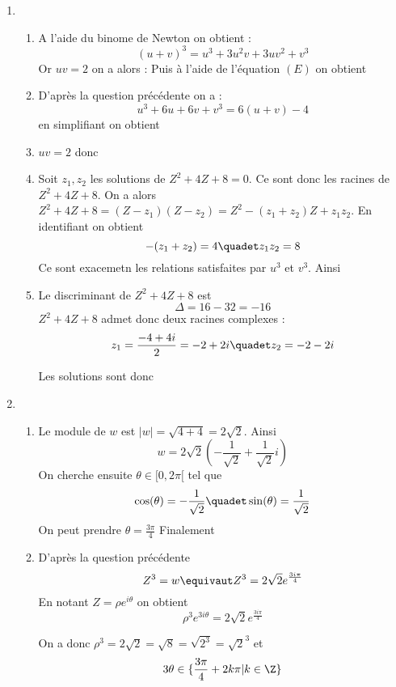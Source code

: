 \documentclass[a4paper, 11pt,reqno]{article}
\begin{document}
\begin{correction}
\begin{enumerate}
\item 
\begin{enumerate}
\item A l'aide du binome de Newton on obtient : 
$$(u+v)^3= u^3 +3u^2v+3uv^2 +v^3$$
Or $uv=2$ on a alors : 
Puis à l'aide de l'équation $(E)$ on obtient 

\item D'après la question précédente  on a : 
$$ u^3 +6u+6v +v^3 = 6(u+v) -4$$
en simplifiant on obtient 

\item 
$uv=2$ donc 

\item Soit $z_1, z_2$ les solutions  de $Z^2+4Z+8=0$. Ce sont donc les racines de $Z^2+4Z+8$. On  a alors 
$Z^2+4Z+8 =(Z-z_1)(Z-z_2)= Z^2 -(z_1+z_2)Z +z_1z_2$. En identifiant on obtient 
$$-(z_1+z_2) = 4 \quadet z_1z_2=8$$
Ce sont exacemetn les relations satisfaites par $u^3$ et $v^3$. Ainsi 

\item Le discriminant de $Z^2+4Z+8$ est 
$$\Delta = 16-32 =-16$$
$Z^2+4Z+8$ admet donc deux racines complexes :
$$z_1 = \frac{-4+4i}{2}= -2+2i \quadet z_2 = -2-2i$$

Les solutions sont donc 
\end{enumerate}
\item 
\begin{enumerate}
\item Le module de $w$ est $|w| = \sqrt{4+4} = 2\sqrt{2}$. Ainsi 
$$w=2\sqrt{2}(-\frac{1}{\sqrt{2}} +\frac{1}{\sqrt{2}} i) $$
On cherche ensuite $\theta \in [0,2\pi[$ tel que 
$$\cos(\theta) =-\frac{1}{\sqrt{2}}  \quadet \sin(\theta)=\frac{1}{\sqrt{2}} $$
On peut prendre $\theta =\frac{3\pi}{4}$
Finalement 

\item D'après la question précédente 
$$Z^3 = w \equivaut Z^3 = 2\sqrt{2} e^{\frac{3i\pi}{4}}$$
En notant $Z= \rho e^{i\theta}$ on obtient 
$$\rho^3 e^{3i\theta} = 2\sqrt{2} e^{\frac{3i\pi}{4}}$$

On a donc $\rho^3= 2\sqrt{2} =\sqrt{8} = \sqrt{2^3}=\sqrt{2}^3$ et 
$$3\theta \in \{ \frac{3\pi }{4} +2k\pi |k\in \Z\}$$


\end{enumerate}
\end{enumerate}
\end{correction}
\end{document}
